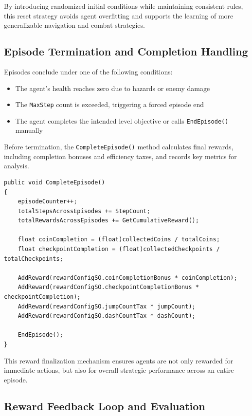\documentclass[12pt,oneside,openright,a4paper]{cpe-english-project}
\begin{document}
By introducing randomized initial conditions while maintaining consistent rules, this reset strategy avoids agent overfitting and supports the learning of more generalizable navigation and combat strategies.

\subsection{Episode Termination and Completion Handling}

Episodes conclude under one of the following conditions:

\begin{itemize}
\item The agent’s health reaches zero due to hazards or enemy damage
\item The \texttt{MaxStep} count is exceeded, triggering a forced episode end
\item The agent completes the intended level objective or calls \texttt{EndEpisode()} manually
\end{itemize}

Before termination, the \texttt{CompleteEpisode()} method calculates final rewards, including completion bonuses and efficiency taxes, and records key metrics for analysis.

\begin{lstlisting}[language={[Sharp]C}]
public void CompleteEpisode()
{
	episodeCounter++;
	totalStepsAcrossEpisodes += StepCount;
	totalRewardsAcrossEpisodes += GetCumulativeReward();
	
	float coinCompletion = (float)collectedCoins / totalCoins;
	float checkpointCompletion = (float)collectedCheckpoints / totalCheckpoints;

	AddReward(rewardConfigSO.coinCompletionBonus * coinCompletion);
	AddReward(rewardConfigSO.checkpointCompletionBonus * checkpointCompletion);
	AddReward(rewardConfigSO.jumpCountTax * jumpCount);
	AddReward(rewardConfigSO.dashCountTax * dashCount);

	EndEpisode();
}
\end{lstlisting}

This reward finalization mechanism ensures agents are not only rewarded for immediate actions, but also for overall strategic performance across an entire episode.

\subsection{Reward Feedback Loop and Evaluation}
\end{document}
